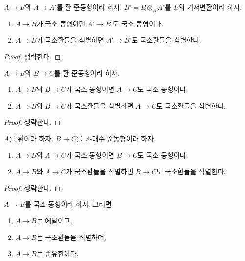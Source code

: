 \begin{lemma}
\label{lemma-base-change-local-isomorphism}
$A \to B$와 $A \to A'$를 환 준동형이라 하자.
$B' = B \otimes_A A'$를 $B$의 기저변환이라 하자.
\begin{enumerate}
\item $A \to B$가 국소 동형이면 $A' \to B'$도 국소 동형이다.
\item $A \to B$가 국소환들을 식별하면 $A' \to B'$도
국소환들을 식별한다.
\end{enumerate}
\end{lemma}

\begin{proof}
생략한다.
\end{proof}

\begin{lemma}
\label{lemma-composition-local-isomorphism}
$A \to B$와 $B \to C$를 환 준동형이라 하자.
\begin{enumerate}
\item $A \to B$와 $B \to C$가 국소 동형이면 $A \to C$도 국소 동형이다.
\item $A \to B$와 $B \to C$가 국소환들을 식별하면
$A \to C$도 국소환들을 식별한다.
\end{enumerate}
\end{lemma}

\begin{proof}
생략한다.
\end{proof}

\begin{lemma}
\label{lemma-local-isomorphism-permanence}
$A$를 환이라 하자. $B \to C$를 $A$-대수 준동형이라 하자.
\begin{enumerate}
\item $A \to B$와 $A \to C$가 국소 동형이면 $B \to C$도 국소 동형이다.
\item $A \to B$와 $A \to C$가 국소환들을 식별하면
$B \to C$도 국소환들을 식별한다.
\end{enumerate}
\end{lemma}

\begin{proof}
생략한다.
\end{proof}

\begin{lemma}
\label{lemma-local-isomorphism-implies}
$A \to B$를 국소 동형이라 하자. 그러면
\begin{enumerate}
\item $A \to B$는 에탈이고,
\item $A \to B$는 국소환들을 식별하며,
\item $A \to B$는 준유한이다.
\end{enumerate}
\end{lemma}

